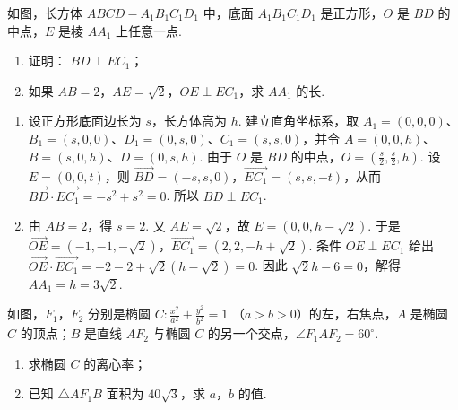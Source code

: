 \begin{problem}
如图，长方体 \(ABCD - A_{1}B_{1}C_{1}D_{1}\) 中，底面 \(A_{1}B_{1}C_{1}D_{1}\) 是正方形，\(O\) 是 \(BD\) 的中点，\(E\) 是棱 \(AA_{1}\) 上任意一点.

\begin{enumerate}
\item 证明： \(BD \perp EC_{1}\)；
\item 如果 \(AB = 2\)，\(AE = \sqrt{2}\)，\(OE \perp EC_1\)，求 \(AA_1\) 的长.
\end{enumerate}

\FloatBarrier
\end{problem}

\begin{solution}
\begin{enumerate}
\item 设正方形底面边长为 \(s\)，长方体高为 \(h\). 建立直角坐标系，取 \(A_1=(0,0,0)\)、\(B_1=(s,0,0)\)、\(D_1=(0,s,0)\)、\(C_1=(s,s,0)\)，并令 \(A=(0,0,h)\)、\(B=(s,0,h)\)、\(D=(0,s,h)\). 由于 \(O\) 是 \(BD\) 的中点，\(O=(\frac{s}{2},\frac{s}{2},h)\). 设 \(E=(0,0,t)\)，则 \(\overrightarrow{BD}=(-s,s,0)\)，\(\overrightarrow{EC_1}=(s,s,-t)\)，从而 \(\overrightarrow{BD}\cdot\overrightarrow{EC_1}=-s^2+s^2=0\). 所以 \(BD\perp EC_1\).
\item 由 \(AB=2\)，得 \(s=2\). 又 \(AE=\sqrt{2}\)，故 \(E=(0,0,h-\sqrt{2})\). 于是 \(\overrightarrow{OE}=(-1,-1,-\sqrt{2})\)，\(\overrightarrow{EC_1}=(2,2,-h+\sqrt{2})\). 条件 \(OE\perp EC_1\) 给出
\(\overrightarrow{OE}\cdot\overrightarrow{EC_1}=-2-2+\sqrt{2}(h-\sqrt{2})=0\).
因此 \(\sqrt{2}h-6=0\)，解得 \(AA_1=h=3\sqrt{2}\).
\end{enumerate}
\end{solution}

\begin{problem}
如图，\(F_{1}\)，\(F_{2}\) 分别是椭圆 \(C: \frac{x^{2}}{a^{2}} + \frac{y^{2}}{b^{2}} = 1 \) （\(a > b > 0\)）的左，右焦点，\(A\) 是椭圆 \(C\) 的顶点；\(B\) 是直线 \(AF_{2}\) 与椭圆 \(C\) 的另一个交点，\(\angle F_{1}AF_{2} = 60^{\circ}\).

\begin{enumerate}
\item 求椭圆 \(C\) 的离心率；
\item 已知 \(\triangle AF_{1}B\) 面积为 \(40\sqrt{3}\)，求 \(a\)，\(b\) 的值.
\end{enumerate}

\FloatBarrier
\end{problem}

